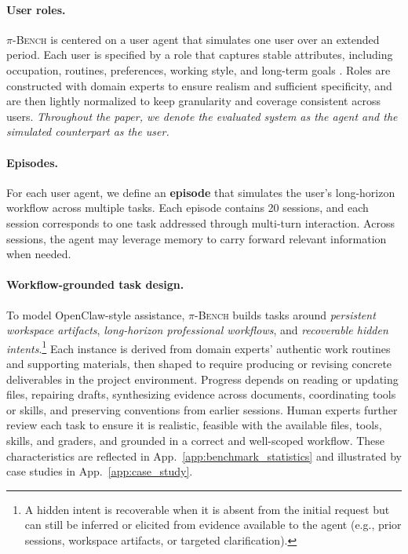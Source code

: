 \documentclass{llmxive}
\providecommand{\bench}{\textsc{$\pi$-Bench}}
\begin{document}
\paragraph{User roles.}
{\bench} is centered on a {user agent} that simulates one user over an extended period. Each user is specified by a role that captures stable attributes, including occupation, routines, preferences, working style, and long-term goals \citep{kim2026persona2web}. 
Roles are constructed with domain experts to ensure realism and sufficient specificity, and are then lightly normalized to keep granularity and coverage consistent across users. \textit{Throughout the paper, we denote the evaluated system as the agent and the simulated counterpart as the user.}

\paragraph{Episodes.}
For each user agent, we define an \textbf{episode} that simulates the user’s long-horizon workflow across multiple tasks. Each episode contains 20 sessions, and each session corresponds to one task addressed through multi-turn interaction. Across sessions, the agent may leverage memory to carry forward relevant information when needed.

\paragraph{Workflow-grounded task design.}
To model OpenClaw-style assistance, {\bench} builds tasks around \emph{persistent workspace artifacts}, \emph{long-horizon professional workflows}, and \emph{recoverable hidden intents}.\footnote{A hidden intent is recoverable when it is absent from the initial request but can still be inferred or elicited from evidence available to the agent (e.g., prior sessions, workspace artifacts, or targeted clarification).} Each instance is derived from domain experts' authentic work routines and supporting materials, then shaped to require producing or revising concrete deliverables in the project environment. Progress depends on reading or updating files, repairing drafts, synthesizing evidence across documents, coordinating tools or skills, and preserving conventions from earlier sessions. Human experts further review each task to ensure it is realistic, feasible with the available files, tools, skills, and graders, and grounded in a correct and well-scoped workflow. These characteristics are reflected in App.~\ref{app:benchmark_statistics} and illustrated by case studies in App.~\ref{app:case_study}.
\end{document}

